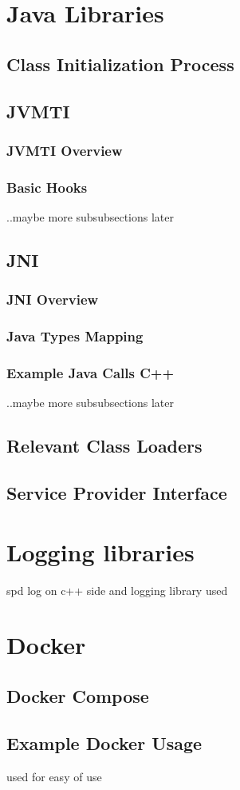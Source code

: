 \section{Java Libraries}
\subsection{Class Initialization Process}
\subsection{JVMTI}
\subsubsection{JVMTI Overview}
\subsubsection{Basic Hooks}
..maybe more subsubsections later
\subsection{JNI}
\subsubsection{JNI Overview}
\subsubsection{Java Types Mapping}
\subsubsection{Example Java Calls  C++}
..maybe more subsubsections later
\subsection{Relevant Class Loaders}
\subsection{Service Provider Interface}

\section{Logging libraries}
spd log on c++ side and 
logging library used
\section{Docker}
\subsection{Docker Compose}
\subsection{Example Docker Usage}
used for easy of use
